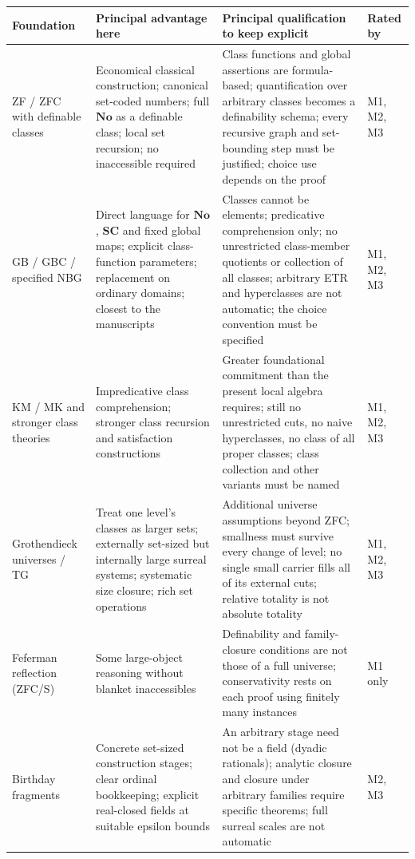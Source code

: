 \documentclass[11pt,letterpaper]{article}
\numberwithin{equation}{section}
\theoremstyle{definition}
\theoremstyle{remark}
\newcommand{\No}{\mathbf{No}}
\newcommand{\SC}{\mathbf{SC}}
\begin{document}
\begin{longtable}{@{}P{0.17\textwidth}P{0.30\textwidth}P{0.34\textwidth}P{0.10\textwidth}@{}}
\toprule
Foundation & Principal advantage here & Principal qualification to keep explicit & Rated by\\
\midrule\endhead
ZF / ZFC with definable classes & Economical classical construction; canonical set-coded numbers; full $\No$ as a definable class; local set recursion; no inaccessible required & Class functions and global assertions are formula-based; quantification over arbitrary classes becomes a definability schema; every recursive graph and set-bounding step must be justified; choice use depends on the proof & M1, M2, M3\\[0.5em]
GB / GBC / specified NBG & Direct language for $\No$, $\SC$ and fixed global maps; explicit class-function parameters; replacement on ordinary domains; closest to the manuscripts & Classes cannot be elements; predicative comprehension only; no unrestricted class-member quotients or collection of all classes; arbitrary ETR and hyperclasses are not automatic; the choice convention must be specified & M1, M2, M3\\[0.5em]
KM / MK and stronger class theories & Impredicative class comprehension; stronger class recursion and satisfaction constructions & Greater foundational commitment than the present local algebra requires; still no unrestricted cuts, no naive hyperclasses, no class of all proper classes; class collection and other variants must be named & M1, M2, M3\\[0.5em]
Grothendieck universes / TG & Treat one level's classes as larger sets; externally set-sized but internally large surreal systems; systematic size closure; rich set operations & Additional universe assumptions beyond ZFC; smallness must survive every change of level; no single small carrier fills all of its external cuts; relative totality is not absolute totality & M1, M2, M3\\[0.5em]
Feferman reflection (ZFC/S) & Some large-object reasoning without blanket inaccessibles & Definability and family-closure conditions are not those of a full universe; conservativity rests on each proof using finitely many instances & M1 only\\[0.5em]
Birthday fragments & Concrete set-sized construction stages; clear ordinal bookkeeping; explicit real-closed fields at suitable epsilon bounds & An arbitrary stage need not be a field (dyadic rationals); analytic closure and closure under arbitrary families require specific theorems; full surreal scales are not automatic & M2, M3\\[0.5em]

\end{longtable}
\end{document}
